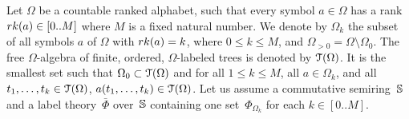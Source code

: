 Let $\Omega$ be a countable ranked alphabet, such that 
every symbol $a \in \Omega$ has a rank 
$\rank(a) \in [0..M]$ where $M$ is a fixed natural number.
We denote by $\Omega_k$ the subset of all symbols $a$ of $\Omega$
with $\rank(a) = k$, where $0 \leq k \leq M$, 
and $\Omega_{>0} = \Omega \setminus \Omega_0$.
%
\noindent 
The free $\Omega$-algebra of finite, ordered, 
$\Omega$-labeled trees is denoted by $\mathcal{T}(\Omega)$.
It is the smallest set such that  $\Omega_0 \subset \mathcal{T}(\Omega)$
and for all $1 \leq k \leq M$, all $a \in \Omega_k$, 
and all $t_1, \ldots, t_k \in \mathcal{T}(\Omega)$, $a(t_1, \ldots, t_k) \in \mathcal{T}(\Omega)$.
%
%
Let us assume a commutative semiring~$\mathbb{S}$ 
and a label theory~$\bar{\Phi}$ over~$\mathbb{S}$ 
containing one set~$\Phi_{\Omega_k}$ for each $k \in [0..M]$.
%
\renewcommand{\call}[1]{\ensuremath \langle_{#1}}
\renewcommand{\return}[1]{\ensuremath {}_{#1}{\rangle}} %

